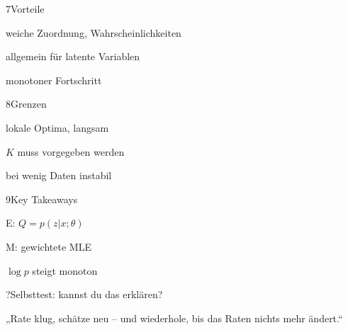 \begin{hngrid}
%
\begin{hnp}[raster multicolumn=2,acc=hngreen]{7}{Vorteile}
\begin{hnpro}
\item weiche Zuordnung, Wahrscheinlichkeiten
\item allgemein für latente Variablen
\item monotoner Fortschritt
\end{hnpro}
\end{hnp}
%
\begin{hnp}[raster multicolumn=2,acc=hnred]{8}{Grenzen}
\begin{hncon}
\item lokale Optima, langsam
\item $K$ muss vorgegeben werden
\item bei wenig Daten instabil
\end{hncon}
\end{hnp}
%
\begin{hnp}[raster multicolumn=2,acc=hnorange]{9}{Key Takeaways}
\begin{hnchk}
\item E: $Q=p(z|x;\theta)$
\item M: gewichtete MLE
\item $\log p$ steigt monoton
\end{hnchk}
\end{hnp}
%
\begin{hnp}[raster multicolumn=6,acc=hnpurple,colback=hnlilac!30]{?}{Selbsttest: kannst du das erklären?}
\end{hnp}
%
\begin{hnbanner}[raster multicolumn=6]
„Rate klug, schätze neu -- und wiederhole, bis das Raten nichts mehr ändert.“
\end{hnbanner}
\end{hngrid}
